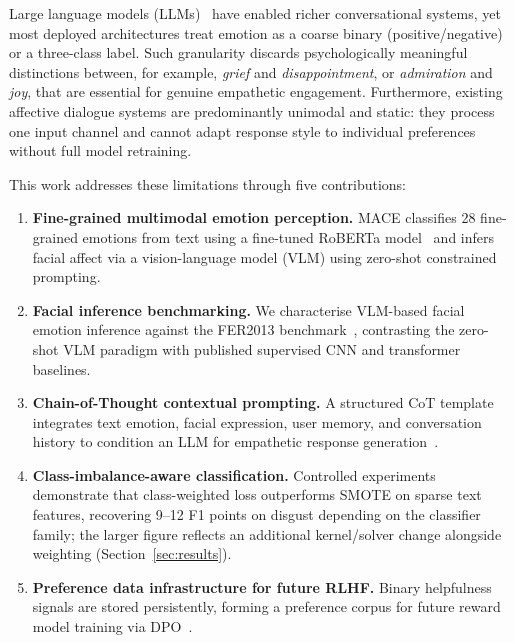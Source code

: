 \documentclass[sigconf, review=true]{acmart}
\begin{document}
Large language models (LLMs)~\cite{devlin2019bert,liu2019roberta}
have enabled richer conversational systems, yet most deployed
architectures treat emotion as a coarse binary (positive/negative)
or a three-class label.
Such granularity discards psychologically meaningful distinctions
between, for example, \emph{grief} and \emph{disappointment}, or
\emph{admiration} and \emph{joy}, that are essential for genuine
empathetic engagement.
Furthermore, existing affective dialogue systems are predominantly
unimodal and static: they process one input channel and cannot
adapt response style to individual preferences without full model
retraining.

This work addresses these limitations through five contributions:

\begin{enumerate}
    \item \textbf{Fine-grained multimodal emotion perception.}
          MACE classifies 28 fine-grained emotions from text
          using a fine-tuned RoBERTa model~\cite{samlow2022goemotions}
          and infers facial affect via a vision-language model
          (VLM) using zero-shot constrained prompting.
    \item \textbf{Facial inference benchmarking.}
          We characterise VLM-based facial emotion inference
          against the FER2013 benchmark~\cite{goodfellow2013fer},
          contrasting the zero-shot VLM paradigm with published
          supervised CNN and transformer baselines.
    \item \textbf{Chain-of-Thought contextual prompting.}
          A structured CoT template integrates text emotion,
          facial expression, user memory, and conversation history
          to condition an LLM for empathetic response
          generation~\cite{wei2022chainofthought}.
    \item \textbf{Class-imbalance-aware classification.}
          Controlled experiments demonstrate that class-weighted
          loss outperforms SMOTE on sparse text features,
          recovering 9--12 F1 points on disgust depending on the
          classifier family; the larger figure reflects an
          additional kernel/solver change alongside weighting
          (Section~\ref{sec:results}).
    \item \textbf{Preference data infrastructure for future RLHF.}
          Binary helpfulness signals are stored persistently,
          forming a preference corpus for future reward model
          training via DPO~\cite{ouyang2022rlhf,rafailov2023dpo}.
\end{enumerate}
\end{document}
